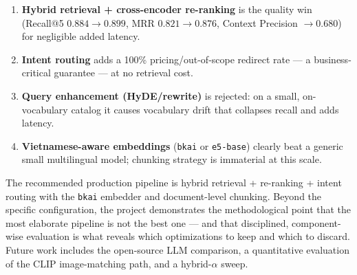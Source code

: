 \begin{enumerate}[leftmargin=1.5em,itemsep=2pt]
  \item \textbf{Hybrid retrieval + cross-encoder re-ranking} is the quality win
        (Recall@5 $0.884\!\to\!0.899$, MRR $0.821\!\to\!0.876$, Context Precision
        $\to0.680$) for negligible added latency.
  \item \textbf{Intent routing} adds a 100\% pricing/out-of-scope redirect rate
        --- a business-critical guarantee --- at no retrieval cost.
  \item \textbf{Query enhancement (HyDE/rewrite)} is rejected: on a small,
        on-vocabulary catalog it causes vocabulary drift that collapses recall
        and adds latency.
  \item \textbf{Vietnamese-aware embeddings} (\texttt{bkai} or \texttt{e5-base})
        clearly beat a generic small multilingual model; chunking strategy is
        immaterial at this scale.
\end{enumerate}

The recommended production pipeline is hybrid retrieval + re-ranking + intent
routing with the \texttt{bkai} embedder and document-level chunking. Beyond the
specific configuration, the project demonstrates the methodological point that
the most elaborate pipeline is not the best one --- and that disciplined,
component-wise evaluation is what reveals which optimizations to keep and which
to discard. Future work includes the open-source LLM comparison, a quantitative
evaluation of the CLIP image-matching path, and a hybrid-$\alpha$ sweep.
